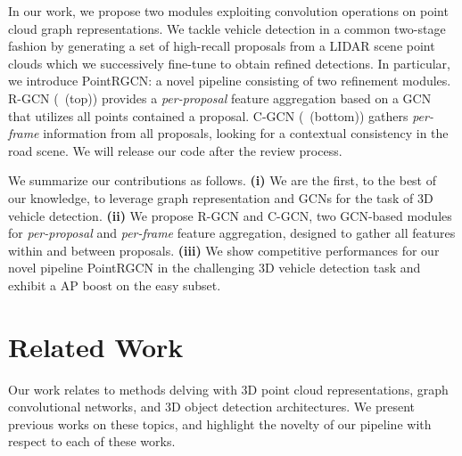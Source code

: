 \documentclass[10pt,twocolumn,letterpaper]{article}
\begin{document}
In our work, we propose two modules exploiting convolution operations on point cloud graph representations.
We tackle vehicle detection in a common two-stage fashion by generating a set of high-recall proposals from a LIDAR scene point clouds which we successively fine-tune to obtain refined detections.
In particular, we introduce PointRGCN: a novel pipeline consisting of two refinement modules.
R-GCN (~(top)) provides a \emph{per-proposal} feature aggregation based on a GCN that utilizes all points contained a proposal. 
C-GCN (~(bottom)) gathers \emph{per-frame} information from all proposals, looking for a contextual consistency in the road scene.
We will release our code after the review process.




 We summarize our contributions as follows.
\textbf{(i)}
We are the first, to the best of our knowledge, to leverage graph representation and GCNs for the task of 3D vehicle detection.
\textbf{(ii)} 
We propose R-GCN and C-GCN, two GCN-based modules for \emph{per-proposal} and \emph{per-frame} feature aggregation, designed to gather all features within and between proposals.
\textbf{(iii)} 
We show competitive performances for our novel pipeline PointRGCN in the challenging \KITTI 3D vehicle detection task and exhibit a  AP boost on the easy subset.



 \section{Related Work}

Our work relates to methods delving with 3D point cloud representations, graph convolutional networks, and 3D object detection architectures.
We present previous works on these topics, and highlight the novelty of our pipeline with respect to each of these works.
\end{document}
